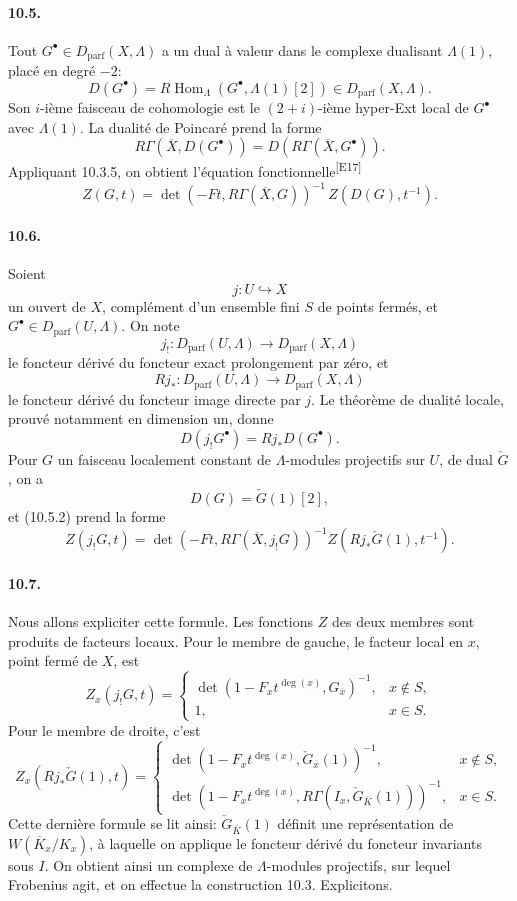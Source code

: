 \documentclass[10pt,letterpaper]{article}
\newcommand{\Hom}{\operatorname{Hom}}
\providecommand{\Hom}{\operatorname{Hom}}
\providecommand{\Hom}{\operatorname{Hom}}
\providecommand{\Dparf}{D_{\mathrm{parf}}}
\providecommand{\Hom}{\operatorname{Hom}}
\newcommand{\auditmark}[1]{\textsuperscript{\normalfont\scriptsize[E#1]}}
\begin{document}
\paragraph{10.5.} Tout \(G^\bullet\in\Dparf(X,\Lambda)\) a un dual à valeur dans le complexe dualisant \(\Lambda(1)\), placé en degré \(-2\):
\[
D(G^\bullet)=R\Hom_\Lambda(G^\bullet,\Lambda(1)[2])\in\Dparf(X,\Lambda).
\]
Son \(i\)-ième faisceau de cohomologie est le \((2+i)\)-ième hyper-Ext local de \(G^\bullet\) avec \(\Lambda(1)\). La dualité de Poincaré prend la forme
\[
\tag{10.5.1}
R\Gamma(\overline X,D(G^\bullet))=D(R\Gamma(\overline X,G^\bullet)).
\]
Appliquant 10.3.5, on obtient l'équation fonctionnelle\auditmark{17}
\[
\tag{10.5.2}
Z(G,t)=
\det(-Ft,R\Gamma(\overline X,G))^{-1}\,
Z(D(G),t^{-1}).
\]

\paragraph{10.6.} Soient
\[
j:U\hookrightarrow X
\]
un ouvert de \(X\), complément d'un ensemble fini \(S\) de points fermés, et \(G^\bullet\in\Dparf(U,\Lambda)\). On note
\[
j_!:\Dparf(U,\Lambda)\longrightarrow\Dparf(X,\Lambda)
\]
le foncteur dérivé du foncteur exact prolongement par zéro, et
\[
Rj_*:\Dparf(U,\Lambda)\longrightarrow\Dparf(X,\Lambda)
\]
le foncteur dérivé du foncteur image directe par \(j\). Le théorème de dualité locale, prouvé notamment en dimension un, donne
\[
\tag{10.6.1}
D(j_!G^\bullet)=Rj_*D(G^\bullet).
\]
Pour \(G\) un faisceau localement constant de \(\Lambda\)-modules projectifs sur \(U\), de dual \(\check G\), on a
\[
D(G)=\check G(1)[2],
\]
et (10.5.2) prend la forme
\[
\tag{10.6.2}
Z(j_!G,t)=
\det(-Ft,R\Gamma(\overline X,j_!G))^{-1}
Z(Rj_*\check G(1),t^{-1}).
\]

\paragraph{10.7.} Nous allons expliciter cette formule. Les fonctions \(Z\) des deux membres sont produits de facteurs locaux. Pour le membre de gauche, le facteur local en \(x\), point fermé de \(X\), est
\[
Z_x(j_!G,t)=
\begin{cases}
\det(1-F_x t^{\deg(x)},G_{\overline x})^{-1},&x\notin S,\\
1,&x\in S.
\end{cases}
\]
Pour le membre de droite, c'est
\[
Z_x(Rj_*\check G(1),t)=
\begin{cases}
\det(1-F_x t^{\deg(x)},\check G_{\overline x}(1))^{-1},&x\notin S,\\
\det(1-F_x t^{\deg(x)},R\Gamma(I_x,\check G_{\overline K}(1)))^{-1},&x\in S.
\end{cases}
\]
Cette dernière formule se lit ainsi: \(\check G_{\overline K}(1)\) définit une représentation de \(W(\overline K_x/K_x)\), à laquelle on applique le foncteur dérivé du foncteur invariants sous \(I\). On obtient ainsi un complexe de \(\Lambda\)-modules projectifs, sur lequel Frobenius agit, et on effectue la construction 10.3. Explicitons.
\end{document}
